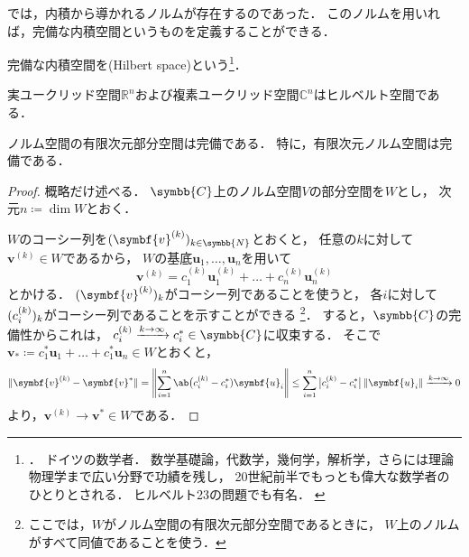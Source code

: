 \documentclass[../sotsu.tex]{subfiles}
\begin{document}
では，内積から導かれるノルムが存在するのであった．
このノルムを用いれば，完備な内積空間というものを定義することができる．

\begin{definition}[ヒルベルト空間]
    \label{dfn:Hilbert-space}
    完備な内積空間を(Hilbert space)という\footnote{
        ．
        ドイツの数学者．
        数学基礎論，代数学，幾何学，解析学，さらには理論物理学まで広い分野で功績を残し，
        20世紀前半でもっとも偉大な数学者のひとりとされる．
        ヒルベルト23の問題でも有名．
        \cite{nipponica}\cite{iwanami-sugakujiten}
    }．
\end{definition}

\begin{proposition}
    実ユークリッド空間$ℝ^n$および複素ユークリッド空間$ℂ^n$はヒルベルト空間である．
\end{proposition}





\begin{theorem}
    \label{thm:subspace-of-norm-space-is-complete}
    ノルム空間の有限次元部分空間は完備である\cite[定理1.2の系]{iwanami-functional}．
    特に，有限次元ノルム空間は完備である．
\end{theorem}

\begin{proof}
    概略だけ述べる．
    $\symbb{C}$上のノルム空間$V$の部分空間を$W$とし，
    次元$n \coloneq \dim W$とおく．
    
    $W$のコーシー列を$\sequ{\symbf{v}^{(k)}}[k \in \symbb{N}]$とおくと，
    任意の$k$に対して$\symbf{v}^{(k)} \in W$であるから，
    $W$の基底$\symbf{u}_1, \dots, \symbf{u}_n$を用いて
    \[  \symbf{v}^{(k)} = c^{(k)}_1 \symbf{u}^{(k)}_1 + \dots + c^{(k)}_n \symbf{u}^{(k)}_n  \]
    とかける．
    $\sequ{\symbf{v}^{(k)}}[k]$がコーシー列であることを使うと，
    各$i$に対して$\sequ{c^{(k)}_i}[k]$がコーシー列であることを示すことができる%
    \footnote{
        ここでは，$W$がノルム空間の有限次元部分空間であるときに，
        $W$上のノルムがすべて同値であることを使う\cite[定理1.2]{iwanami-functional}．
    }．
    すると，$\symbb{C}$の完備性からこれは，
    $c^{(k)}_i \xrightarrow{k \to \infty} c^*_i \in \symbb{C}$に収束する．
    そこで$\symbf{v}_* \coloneq c^*_1 \symbf{u}_1 + \dots + c^*_1 \symbf{u}_n \in W$とおくと，
    \begin{equation*}
        \begin{split}
            \norm{ \symbf{v}^{(k)} - \symbf{v}^* }
                = \norm*{ \sum_{i = 1}^{n} \ab\big(c^{(k)}_i - c^*_i) \symbf{u}_i }
                \leq \sum_{i=1}^{n} \, \abs[\big]{ c^{(k)}_i - c^*_i } \, \norm{ \symbf{u}_i }
                \xrightarrow{k \to \infty} 0
        \end{split}
    \end{equation*}
    より，$\symbf{v}^{(k)} \to \symbf{v}^* \in W$である．
\end{proof}
\end{document}
